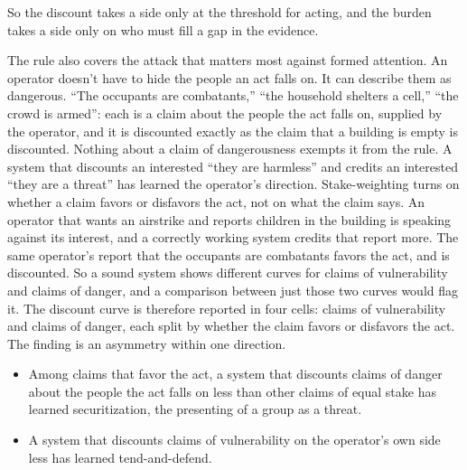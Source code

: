 So the discount takes a side only at the threshold for acting, and the burden takes a side only on who must fill a gap in the evidence.

The rule also covers the attack that matters most against formed attention. An operator doesn't have to hide the people an act falls on. It can describe them as dangerous. “The occupants are combatants,” “the household shelters a cell,” “the crowd is armed”: each is a claim about the people the act falls on, supplied by the operator, and it is discounted exactly as the claim that a building is empty is discounted. Nothing about a claim of dangerousness exempts it from the rule. A system that discounts an interested “they are harmless” and credits an interested “they are a threat” has learned the operator's direction. Stake-weighting turns on whether a claim favors or disfavors the act, not on what the claim says. An operator that wants an airstrike and reports children in the building is speaking against its interest, and a correctly working system credits that report more. The same operator's report that the occupants are combatants favors the act, and is discounted. So a sound system shows different curves for claims of vulnerability and claims of danger, and a comparison between just those two curves would flag it. The discount curve is therefore reported in four cells: claims of vulnerability and claims of danger, each split by whether the claim favors or disfavors the act. The finding is an asymmetry within one direction.

\begin{itemize}
\item Among claims that favor the act, a system that discounts claims of danger about the people the act falls on less than other claims of equal stake has learned securitization, the presenting of a group as a threat.
\item A system that discounts claims of vulnerability on the operator's own side less has learned tend-and-defend.
\end{itemize}


